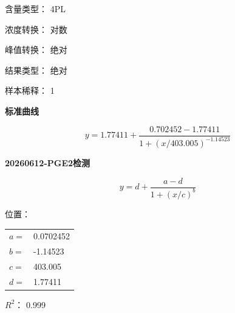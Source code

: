 \documentclass[UTF8,10pt,a4paper,fontset=fandol]{ctexart}
\newcommand{\fieldvalue}[1]{#1}
\begin{document}
\noindent
含量类型：
\fieldvalue{4PL}

\noindent
浓度转换：
\fieldvalue{对数}

\noindent
峰值转换：
\fieldvalue{绝对}

\noindent
结果类型：
\fieldvalue{绝对}

\noindent
样本稀释：
\fieldvalue{1}

\medskip
\begin{center}
\textbf{标准曲线}

\end{center}

\[
y=1.77411+
\frac{0.702452-1.77411}
 {1+\left(x/403.005\right)^{-1.14523}}
\]

\newpage

\textbf{20260612-PGE2检测}

\[
y=d+\frac{a-d}{1+(x/c)^b}
\]

位置：

\begin{tabular}{ll}
$a=$ &
\fieldvalue{0.0702452}\\
$b=$ &
\fieldvalue{-1.14523}\\
$c=$ &
\fieldvalue{403.005}\\
$d=$ &
\fieldvalue{1.77411}
\end{tabular}

$R^2$：
\fieldvalue{0.999}

\smallskip
\end{document}

